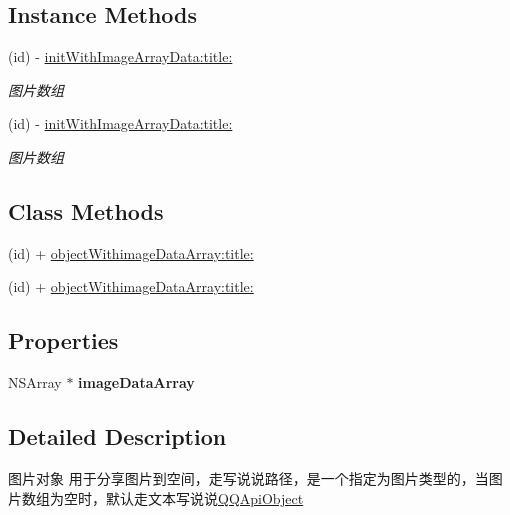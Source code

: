 \subsection*{Instance Methods}
\begin{DoxyCompactItemize}
\item 
(id) -\/ \mbox{\hyperlink{interface_q_q_api_image_array_for_q_zone_object_a2923b08e297ff267c7d58f3bfe361918}{init\+With\+Image\+Array\+Data\+:title\+:}}
\begin{DoxyCompactList}\small\item\em 图片数组 \end{DoxyCompactList}\item 
(id) -\/ \mbox{\hyperlink{interface_q_q_api_image_array_for_q_zone_object_a2923b08e297ff267c7d58f3bfe361918}{init\+With\+Image\+Array\+Data\+:title\+:}}
\begin{DoxyCompactList}\small\item\em 图片数组 \end{DoxyCompactList}\end{DoxyCompactItemize}
\subsection*{Class Methods}
\begin{DoxyCompactItemize}
\item 
(id) + \mbox{\hyperlink{interface_q_q_api_image_array_for_q_zone_object_ae0a6bed0342da7980cb8ea5a2b0859e7}{object\+Withimage\+Data\+Array\+:title\+:}}
\item 
(id) + \mbox{\hyperlink{interface_q_q_api_image_array_for_q_zone_object_ae0a6bed0342da7980cb8ea5a2b0859e7}{object\+Withimage\+Data\+Array\+:title\+:}}
\end{DoxyCompactItemize}
\subsection*{Properties}
\begin{DoxyCompactItemize}
\item 
\mbox{\label{interface_q_q_api_image_array_for_q_zone_object_af0af890c04ecf303b984fe99ac86b0fe}} 
N\+S\+Array $\ast$ {\bfseries image\+Data\+Array}
\end{DoxyCompactItemize}


\subsection{Detailed Description}
图片对象 用于分享图片到空间，走写说说路径，是一个指定为图片类型的，当图片数组为空时，默认走文本写说说{\ttfamily \mbox{\hyperlink{interface_q_q_api_object}{Q\+Q\+Api\+Object}}} 

